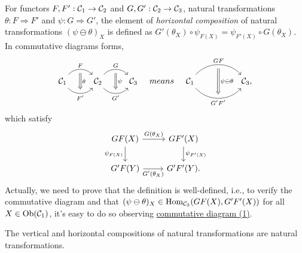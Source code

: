 \documentclass{article}
\begin{document}
\begin{defi}\label{horizontal composition}
	For functors $F,F':\mathcal{C}_1\to\mathcal{C}_2$ and $G,G':\mathcal{C}_2\to\mathcal{C}_3$, natural transformations $\theta:F\Rightarrow F'$ and $\psi:G\Rightarrow G'$, the element of \emph{horizontal composition} of natural transformations $(\psi\ominus\theta)_X$ is defined as $G'(\theta_X)\circ\psi_{F(X)}=\psi_{F'(X)}\circ G(\theta_X)$. In commutative diagrams forms,
	\[\begin{tikzcd}
			\C_1 \arrow[bend left=50, r, "F", ""' name=F] \arrow[bend right=50, r, "F'"', "" name=F'] &
			\C_2 \arrow[bend left=50, r, "G", ""' name=G] \arrow[bend right=50, r, "G'"', "" name=G'] &
			\arrow[Rightarrow, from=F, to=F', "\theta"] \arrow[Rightarrow, from=G, to=G', "\psi"]\C_3
		\end{tikzcd}\quad{means}\quad\begin{tikzcd}
			\C_1
			\arrow[bend left=50, rr, "GF", ""' name=A]
			\arrow[bend right=50, rr, "G'F'"', "" name=B] & & 
			\arrow[Rightarrow, from=A, to=B, "\psi\ominus\theta"]\C_3,
	\end{tikzcd}\]
	which satisfy
	\begin{equation}\begin{tikzcd}\label{hor}
		GF(X) \arrow[r,"G(\theta_X)"] \arrow[d,"\psi_{F(X)}"'] & GF'(X) \arrow[d,"\psi_{F'(X)}"]\\
		G'F(Y) \arrow[r,"G'(\theta_X)"'] & G'F'(Y).
	\end{tikzcd}\end{equation}
	Actually, we need to prove that the definition is well-defined, i.e., to verify the commutative diagram and that $(\psi\ominus\theta)_X\in\mathrm{Hom}_{\mathcal{C}_3}(GF(X),G'F'(X))$ for all $X\in\mathrm{Ob}(\mathcal{C}_1)$, it's easy to do so observing \hyperref[ntr]{commutative diagram (1)}.
\end{defi}


\begin{thm}
	The vertical and horizontal compositions of natural transformations are natural transformations.	
\end{thm}
\end{document}
